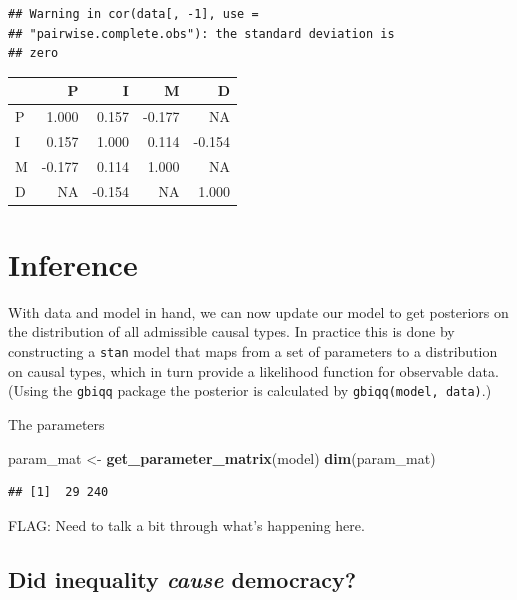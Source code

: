 \documentclass[12pt,]{book}
\newenvironment{Shaded}{\begin{snugshade}}{\end{snugshade}}
\newcommand{\KeywordTok}[1]{\textcolor[rgb]{0.13,0.29,0.53}{\textbf{#1}}}
\newcommand{\NormalTok}[1]{#1}
\newcommand{\StringTok}[1]{\textcolor[rgb]{0.31,0.60,0.02}{#1}}
\begin{document}
\begin{verbatim}
## Warning in cor(data[, -1], use =
## "pairwise.complete.obs"): the standard deviation is
## zero
\end{verbatim}

\begin{tabular}{l|r|r|r|r}
\hline
  & P & I & M & D\\
\hline
P & 1.000 & 0.157 & -0.177 & NA\\
\hline
I & 0.157 & 1.000 & 0.114 & -0.154\\
\hline
M & -0.177 & 0.114 & 1.000 & NA\\
\hline
D & NA & -0.154 & NA & 1.000\\
\hline
\end{tabular}

\hypertarget{inference}{%
\section{Inference}\label{inference}}

With data and model in hand, we can now update our model to get posteriors on the distribution of all admissible causal types. In practice this is done by constructing a \texttt{stan} model that maps from a set of parameters to a distribution on causal types, which in turn provide a likelihood function for observable data. (Using the \texttt{gbiqq} package the posterior is calculated by \texttt{gbiqq(model,\ data)}.)

The parameters

\begin{Shaded}
\begin{Highlighting}[]
\NormalTok{param_mat <-}\StringTok{ }\KeywordTok{get_parameter_matrix}\NormalTok{(model)}
\KeywordTok{dim}\NormalTok{(param_mat)}
\end{Highlighting}
\end{Shaded}

\begin{verbatim}
## [1]  29 240
\end{verbatim}

FLAG: Need to talk a bit through what's happening here.

\hypertarget{did-inequality-cause-democracy}{%
\subsection{\texorpdfstring{Did inequality \emph{cause} democracy?}{Did inequality cause democracy?}}\label{did-inequality-cause-democracy}}
\end{document}
